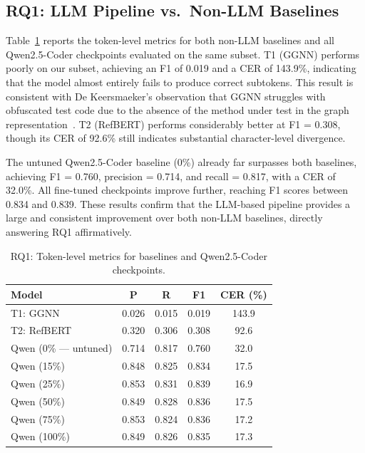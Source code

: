 \documentclass[conference]{IEEEtran}
\begin{document}
\subsection{RQ1: LLM Pipeline vs.\ Non-LLM Baselines}

Table~\ref{tab:rq1} reports the token-level metrics for both non-LLM baselines
and all Qwen2.5-Coder checkpoints evaluated on the same subset.
T1 (GGNN) performs poorly on our subset, achieving an F1 of 0.019 and a CER of
143.9\%, indicating that the model almost entirely fails to produce correct
subtokens.
This result is consistent with De Keersmaeker's observation that GGNN struggles
with obfuscated test code due to the absence of the method under test in the
graph representation~\cite{dekeersmaeker2024enhancing}.
T2 (RefBERT) performs considerably better at F1 = 0.308, though its CER of
92.6\% still indicates substantial character-level divergence.

The untuned Qwen2.5-Coder baseline (0\%) already far surpasses both baselines,
achieving F1 = 0.760, precision = 0.714, and recall = 0.817, with a CER of
32.0\%.
All fine-tuned checkpoints improve further, reaching F1 scores between 0.834
and 0.839.
These results confirm that the LLM-based pipeline provides a large and
consistent improvement over both non-LLM baselines, directly answering RQ1
affirmatively.

\begin{table}[t]
  \centering
  \caption{RQ1: Token-level metrics for baselines and Qwen2.5-Coder checkpoints.}
  \label{tab:rq1}
  \begin{tabular}{lcccc}
    \toprule
    \textbf{Model} & \textbf{P} & \textbf{R} & \textbf{F1} & \textbf{CER (\%)} \\
    \midrule
    T1: GGNN              & 0.026 & 0.015 & 0.019 & 143.9 \\
    T2: RefBERT           & 0.320 & 0.306 & 0.308 &  92.6 \\
    \midrule
    Qwen (0\% --- untuned)& 0.714 & 0.817 & 0.760 &  32.0 \\
    Qwen (15\%)           & 0.848 & 0.825 & 0.834 &  17.5 \\
    Qwen (25\%)           & 0.853 & 0.831 & 0.839 &  16.9 \\
    Qwen (50\%)           & 0.849 & 0.828 & 0.836 &  17.5 \\
    Qwen (75\%)           & 0.853 & 0.824 & 0.836 &  17.2 \\
    Qwen (100\%)          & 0.849 & 0.826 & 0.835 &  17.3 \\
    \bottomrule
  \end{tabular}
\end{table}
\end{document}
